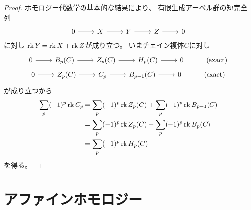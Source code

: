\documentclass[report]{jlreq}
\begin{document}
\begin{proof}
    ホモロジー代数学の基本的な結果により、
    有限生成アーベル群の短完全列
    \begin{equation}
        \begin{tikzcd}
            0
                \ar{r}
                & X
                    \ar{r}
                & Y
                    \ar{r}
                & Z
                    \ar{r}
                & 0
        \end{tikzcd}
    \end{equation}
    に対し
    $\operatorname{rk} Y = \operatorname{rk} X + \operatorname{rk} Z$が成り立つ。
    いまチェイン複体$C$に対し
    \begin{gather}
        \begin{tikzcd}[ampersand replacement=\&]
            0
                \ar{r}
                \& B_p(C)
                    \ar{r}
                \& Z_p(C)
                    \ar{r}
                \& H_p(C)
                    \ar{r}
                \& 0
                \& (\text{exact})
        \end{tikzcd} \\
        \begin{tikzcd}[ampersand replacement=\&]
            0
                \ar{r}
                \& Z_p(C)
                    \ar{r}
                \& C_p
                    \ar{r}
                \& B_{p - 1}(C)
                    \ar{r}
                \& 0
                \& (\text{exact})
        \end{tikzcd}
    \end{gather}
    が成り立つから
    \begin{alignat}{1}
        \sum_p (-1)^p \operatorname{rk} C_p
            &= \sum_p (-1)^p \operatorname{rk} Z_p(C)
                + \sum_p (-1)^p \operatorname{rk} B_{p - 1}(C) \\
            &= \sum_p (-1)^p \operatorname{rk} Z_p(C)
                - \sum_p (-1)^p \operatorname{rk} B_p(C) \\
            &= \sum_p (-1)^p \operatorname{rk} H_p(C)
    \end{alignat}
    を得る。
\end{proof}




%
\section{アファインホモロジー}
\end{document}
